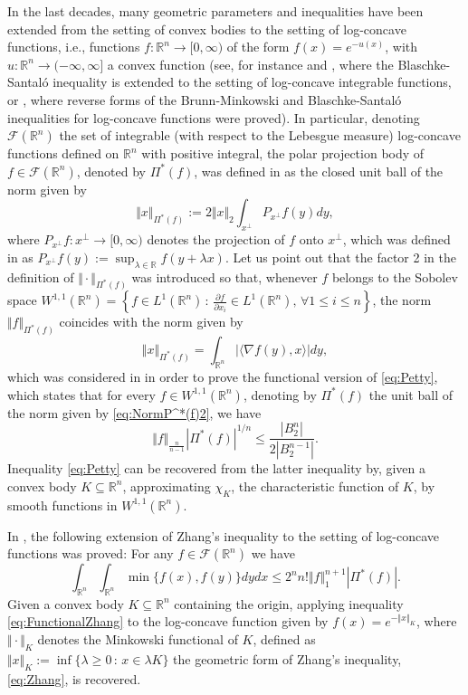 \documentclass{amsart}
\newcommand{\R}{\mathbb R}
\theoremstyle{remark}
\theoremstyle{definition}
\numberwithin{equation}{section}
\begin{document}
In the last decades, many geometric parameters and inequalities have been extended from the setting of convex bodies to the setting of log-concave functions, i.e., functions $f:\R^n\to[0,\infty)$ of the form $f(x)=e^{-u(x)}$, with $u:\R^n\to (-\infty,\infty]$ a convex function (see, for instance \cite{AKV} and \cite{Ba0}, where the Blaschke-Santal\'o inequality is extended to the setting of log-concave integrable functions, or \cite{KM}, where reverse forms of the Brunn-Minkowski and Blaschke-Santal\'o inequalities for log-concave functions were proved). In particular, denoting $\mathcal{F}(\R^n)$ the set of integrable (with respect to the Lebesgue measure) log-concave functions defined on $\R^n$ with positive integral, the polar projection body of $f\in\mathcal{F}(\R^n)$, denoted by $\Pi^*(f)$, was defined in \cite{AGJV} as the closed unit ball of the norm given by
$$
\Vert x\Vert_{\Pi^*(f)}:=2\Vert x\Vert_2\int_{x^\perp}P_{x^\perp}f(y)dy,
$$
where $P_{x^\perp}f:x^\perp\to[0,\infty)$ denotes the projection of $f$ onto $x^\perp$, which was defined in \cite{KM} as $\displaystyle{P_{x^\perp}f(y):=\sup_{\lambda\in\R}f(y+\lambda x)}$. Let us point out that the factor 2 in the definition of $\Vert\cdot\Vert_{\Pi^*(f)}$ was introduced so that, whenever $f$ belongs to the Sobolev space $W^{1,1}(\R^n)=\left\{f\in L^1(\R^n)\,:\,\frac{\partial f}{\partial x_i}\in L^1(\R^n),\,\forall 1\leq i\leq n\right\}$, the norm $\Vert f\Vert_{\Pi^*(f)}$ coincides with the norm given by
\begin{equation}\label{eq:NormP^*(f)2}
\Vert x\Vert_{\Pi^*(f)}=\int_{\R^n}|\langle\nabla f(y),x\rangle|dy,
\end{equation}
which was considered in \cite{Zh2} in order to prove the functional version of \eqref{eq:Petty}, which states that for every $f\in W^{1,1}(\R^n)$, denoting by $\Pi^*(f)$ the unit ball of the norm given by \eqref{eq:NormP^*(f)2}, we have
$$
\Vert f\Vert_{\frac{n}{n-1}}|\Pi^*(f)|^{1/n}\leq\frac{|B_2^n|}{2\left|B_2^{n-1}\right|}.
$$
Inequality \eqref{eq:Petty} can be recovered from the latter inequality by, given a convex body $K\subseteq\R^n$, approximating $\chi_K$, the characteristic function of $K$, by smooth functions in $W^{1,1}(\R^n)$.

In \cite{ABG1}, the following extension of Zhang's inequality to the setting of log-concave functions was proved: For any $f\in\mathcal{F}(\R^n)$ we have
\begin{equation}\label{eq:FunctionalZhang}
\int_{\R^n}\int_{\R^n}\min\{f(x),f(y)\}dydx\leq 2^n n!\Vert f\Vert_1^{n+1}|\Pi^*(f)|.
\end{equation}
Given a convex body $K\subseteq\R^n$ containing the origin, applying inequality \eqref{eq:FunctionalZhang} to the log-concave function given by $f(x)=e^{-\Vert x\Vert_K}$, where $\Vert\cdot\Vert_K$ denotes the Minkowski functional of $K$, defined as $\Vert x\Vert_K:=\inf\{\lambda\geq0\,:\,x\in\lambda K\}$ the geometric form of Zhang's inequality, \eqref{eq:Zhang}, is recovered.
\end{document}
